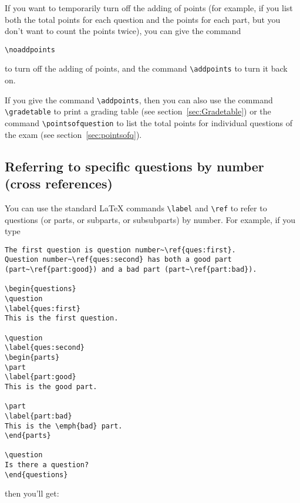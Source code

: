 \documentclass[12pt]{exam}
\begin{document}
If you want to temporarily turn off the adding of points (for example,
if you list both the total points for each question and the points for
each part, but you don't want to count the points twice), you can give
the command
\begin{center}
  \verb"\noaddpoints"
\end{center}
to turn off the adding of points, and the command \verb"\addpoints" to
turn it back on.

If you give the command \verb"\addpoints", then you can also use the
command \verb"\gradetable" to print a grading table (see
section~\ref{sec:Gradetable}) or the command \verb"\pointsofquestion"
to list the total points for individual questions of the exam (see
section~\ref{sec:pointsofq}).

\subsection{Referring to specific questions by number (cross
  references)}

You can use the standard \LaTeX{} commands \verb"\label" and
\verb"\ref" to refer to questions (or parts, or subparts, or
subsubparts) by number.  For example, if you type
%
\begin{verbatim}
The first question is question number~\ref{ques:first}.
Question number~\ref{ques:second} has both a good part
(part~\ref{part:good}) and a bad part (part~\ref{part:bad}).

\begin{questions}
\question
\label{ques:first}
This is the first question.

\question
\label{ques:second}
\begin{parts}
\part
\label{part:good}
This is the good part.

\part
\label{part:bad}
This is the \emph{bad} part.
\end{parts}

\question
Is there a question?
\end{questions}
\end{verbatim}
%
then you'll get:
\end{document}
